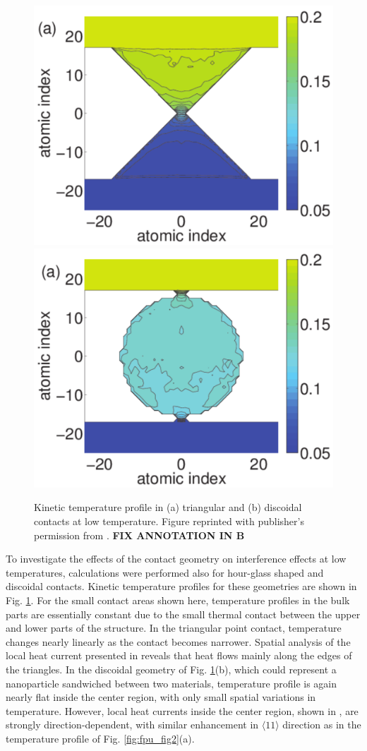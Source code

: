 \begin{figure}
\begin{center}
 \includegraphics[width=.49\columnwidth]{pics/aip_fig5a.pdf}
 \includegraphics[width=.49\columnwidth]{pics/aip_fig6a.pdf}
 \caption{Kinetic temperature profile in (a) triangular and (b) discoidal contacts at low temperature. Figure reprinted with publisher's permission from . \textbf{FIX ANNOTATION IN B}}
\label{fig:aip_figs56}
\end{center}
\end{figure}

To investigate the effects of the contact geometry on interference effects at low temperatures, calculations were performed also for hour-glass shaped and discoidal contacts. Kinetic temperature profiles for these geometries are shown in Fig. \ref{fig:aip_figs56}. For the small contact areas shown here, temperature profiles in the bulk parts are essentially constant due to the small thermal contact between the upper and lower parts of the structure. In the triangular point contact, temperature changes nearly linearly as the contact becomes narrower. Spatial analysis of the local heat current presented in  reveals that heat flows mainly along the edges of the triangles. In the discoidal geometry of Fig. \ref{fig:aip_figs56}(b), which could represent a nanoparticle sandwiched between two materials, temperature profile is again nearly flat inside the center region, with only small spatial variations in temperature. However, local heat currents inside the center region, shown in , are strongly direction-dependent, with similar enhancement in $\langle 11\rangle$ direction as in the temperature profile of Fig. \ref{fig:fpu_fig2}(a).

